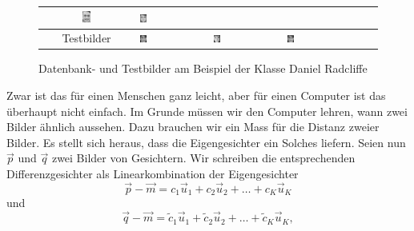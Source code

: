 \begin{figure}[ht]
\begin{tabular}{|c m{2cm} m{2cm} m{2cm} m{2cm} m{2cm}|}
		\includegraphics[width=0.1\textwidth]{images/recognition/training_faces/training_8} &
		\includegraphics[width=0.1\textwidth]{images/recognition/training_faces/training_9} \\ \hline
		Testbilder &
		\includegraphics[width=0.1\textwidth]{images/recognition/test_faces/test_0} &
		\includegraphics[width=0.1\textwidth]{images/recognition/test_faces/test_1} &
		\includegraphics[width=0.1\textwidth]{images/recognition/test_faces/test_2} &
		& \\ \hline
	\end{tabular}
	\caption{Datenbank- und Testbilder am Beispiel der Klasse \glqq{}Daniel Radcliffe\grqq{}}
	\label{fig:testfaces}
\end{figure}
Zwar ist das für einen Menschen ganz leicht, aber für einen Computer ist das überhaupt nicht einfach.
Im Grunde müssen wir den Computer lehren, wann zwei Bilder ähnlich aussehen.
Dazu brauchen wir ein Mass für die Distanz zweier Bilder.
Es stellt sich heraus, dass die Eigengesichter ein Solches liefern.
Seien nun $\vec p$ und $\vec q$ zwei Bilder von Gesichtern.
Wir schreiben die entsprechenden Differenzgesichter als Linearkombination der Eigengesichter
\begin{equation*}
	\vec p-\vec m=c_1\vec u_1+c_2\vec u_2+\ldots+c_K\vec u_K
\end{equation*}
und
\begin{equation*}
	\vec q-\vec m=\tilde c_1\vec u_1+\tilde c_2\vec u_2+\ldots+\tilde c_K\vec u_K,
\end{equation*}
